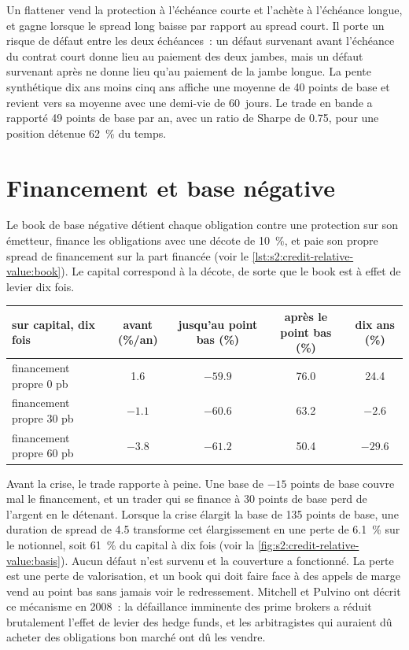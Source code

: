 Un flattener vend la protection à l'échéance courte et l'achète à l'échéance longue, et gagne lorsque le spread long baisse par rapport au spread court. Il porte
un risque de défaut entre les deux échéances~: un défaut survenant avant l'échéance du contrat court donne lieu au paiement des deux jambes, mais un défaut survenant après ne donne lieu qu'au paiement de la jambe longue. La pente synthétique
dix ans moins cinq ans affiche une moyenne de 40 points de base et revient vers sa moyenne avec une demi-vie de 60~jours. Le trade en bande a rapporté 49 points de base par an, avec un ratio de Sharpe
de 0.75, pour une position détenue 62~\% du temps.

\section{Financement et base négative}

Le book de base négative détient chaque obligation contre une protection sur son émetteur, finance les obligations avec une décote de 10~\%, et paie son propre spread de financement sur
la part financée (voir le \cref{lst:s2:credit-relative-value:book}). Le capital correspond à la décote, de sorte que le book est à effet de levier dix fois.

\begin{center}
\small
\setlength{\tabcolsep}{4pt}%
\begin{tabular}{@{}lcccc@{}}
\toprule
sur capital, dix fois & avant (\%/an) & jusqu'au point bas (\%) & après le point bas (\%) & dix ans (\%)\\
\midrule
financement propre 0 pb & 1.6 & $-59.9$ & 76.0 & 24.4\\
financement propre 30 pb & $-1.1$ & $-60.6$ & 63.2 & $-2.6$\\
financement propre 60 pb & $-3.8$ & $-61.2$ & 50.4 & $-29.6$\\
\bottomrule
\end{tabular}
\end{center}

Avant la crise, le trade rapporte à peine. Une base de $-15$ points de base couvre mal le financement, et un trader qui se finance à 30 points de base perd
de l'argent en le détenant. Lorsque la crise élargit la base de 135 points de base, une duration de spread de 4.5 transforme cet élargissement en une perte de 6.1~\% sur le notionnel, soit 61~\% du
capital à dix fois (voir la \cref{fig:s2:credit-relative-value:basis}). Aucun défaut n'est survenu et la couverture a fonctionné. La perte est une perte de valorisation, et un book qui doit faire face
à des appels de marge vend au point bas sans jamais voir le redressement. Mitchell et Pulvino ont décrit ce mécanisme en 2008~: la défaillance imminente des
prime brokers a réduit brutalement l'effet de levier des hedge funds, et les arbitragistes qui auraient dû acheter des obligations bon marché ont dû les vendre.

